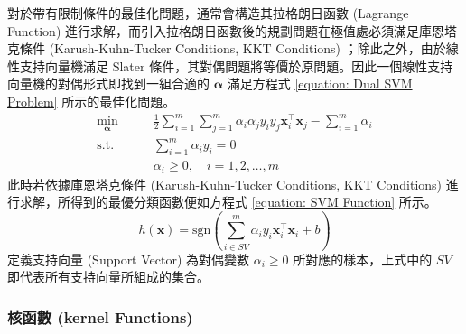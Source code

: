 對於帶有限制條件的最佳化問題，通常會構造其拉格朗日函數 (Lagrange Function) 進行求解，而引入拉格朗日函數後的規劃問題在極值處必須滿足庫恩塔克條件 (Karush-Kuhn-Tucker Conditions, KKT Conditions) ；除此之外，由於線性支持向量機滿足 Slater 條件，其對偶問題將等價於原問題。因此一個線性支持向量機的對偶形式即找到一組合適的 $\boldsymbol{\alpha}$ 滿足方程式 \eqref{equation: Dual SVM Problem} 所示的最佳化問題。
%
\begin{equation}\label{equation: Dual SVM Problem}
  \begin{aligned}
    \min_{\boldsymbol{\alpha}} \qquad & \frac{1}{2} \sum_{i = 1}^{m} \sum_{j = 1}^{m} \alpha_i \alpha_j y_i y_j \boldsymbol{x}_i^{\top} \boldsymbol{x}_j - \sum_{i = 1}^{m} \alpha_{i} \\
    \text{s.t.}                \qquad & \sum_{i = 1}^{m} \alpha_{i} y_{i} = 0 \\
    \qquad                            & \alpha_{i} \geq 0 ,\quad i = 1, 2, \ldots, m
  \end{aligned}
\end{equation}
%
此時若依據庫恩塔克條件 (Karush-Kuhn-Tucker Conditions, KKT Conditions) 進行求解，所得到的最優分類函數便如方程式 \eqref{equation: SVM Function} 所示。
%
\begin{equation}\label{equation: SVM Function}
  h(\boldsymbol{x}) = \text{sgn} \left( \sum_{i \in SV}^{m} \alpha_{i}y_{i} \boldsymbol{x}_{i}^{\top} \boldsymbol{x}_{i} + b \right)
\end{equation}
%
定義支持向量 (Support Vector) 為對偶變數 $\alpha_{i} \geq 0$ 所對應的樣本，上式中的 $SV$ 即代表所有支持向量所組成的集合。

\subsubsection{核函數 (kernel Functions)}

